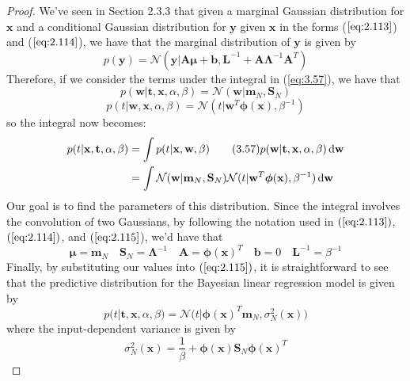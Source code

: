 \begin{proof}
    We've seen in Section 2.3.3 that given a marginal Gaussian distribution
    for $\mathbf{x}$ and a conditional Gaussian distribution for $\mathbf{y}$
    given $\mathbf{x}$ in the forms ($\ref{eq:2.113}$) and ($\ref{eq:2.114}$),
    we have that the marginal distribution of $\mathbf{y}$ is given by
    \begin{equation*}
        p(\mathbf{y}) 
        = \mathcal{N}(\mathbf{y} | \mathbf{A}\bm{\mu} + \mathbf{b}, \mathbf{L}^{-1}
            + \mathbf{A\Lambda}^{-1} \mathbf{A}^T) 
        \tag{2.115}\label{eq:2.115}
    \end{equation*}
    Therefore, if we consider the terms under the integral in (\ref{eq:3.57}),
    we have that
    \[
        p(\mathbf{w} | \mathbf{t}, \mathbf{x}, \alpha, \beta) 
        = \mathcal{N}(\mathbf{w} | \mathbf{m}_N, \mathbf{S}_N)
    \] 
    \[
        p(t | \mathbf{w}, \mathbf{x}, \alpha, \beta) 
        = \mathcal{N}(t | \mathbf{w}^T\bm{\phi}(\mathbf{x}), \beta^{-1}) 
    \] 
    so the integral now becomes:
    \begin{align*}
        p(t | \mathbf{x}, \mathbf{t}, \alpha, \beta)
        &= \int p(t | \mathbf{x}, \mathbf{w}, \beta) \label{eq:3.57} \tag{3.57}
            p(\mathbf{w} | \mathbf{t}, \mathbf{x}, \alpha, \beta) \mathop{}\!\mathrm{d} \mathbf{w} \\
        &= \int \mathcal{N}(\mathbf{w} | \mathbf{m}_N, \mathbf{S}_N)
        \mathcal{N}(t | \mathbf{w}^T\bm{\phi}(\mathbf{x}), \beta^{-1}) \mathop{}\!\mathrm{d} \mathbf{w}
    \end{align*}
    Our goal is to find the parameters of this distribution. Since 
    the integral involves the convolution of two Gaussians, by following
    the notation used in $(\ref{eq:2.113})$, $(\ref{eq:2.114})$, and $(\ref{eq:2.115}$),
    we'd have that
    \[
        \bm{\mu} = \mathbf{m}_N 
        \hspace{1em}
        \mathbf{S}_N = \mathbf{\Lambda}^{-1}
        \hspace{1em}
        \mathbf{A} = \bm{\phi}(\mathbf{x})^T
        \hspace{1em}
        \mathbf{b} = 0
        \hspace{1em}
        \mathbf{L}^{-1} = \beta^{-1}
    \] 
    Finally, by substituting our values into $(\ref{eq:2.115})$, it is 
    straightforward to see that the predictive distribution for the Bayesian 
    linear regression model is given by
    \begin{equation*}
        p(t | \mathbf{t}, \mathbf{x}, \alpha, \beta) 
        = \mathcal{N}\big(t | \bm{\phi}(\mathbf{x})^T\mathbf{m}_N, \sigma^2_N(\mathbf{x})\big)
        \tag{3.58}\label{eq:3.58}
    \end{equation*}
    where the input-dependent variance is given by
    \begin{equation*}
        \sigma_{N}^2(\mathbf{x})
        = \frac{1}{\beta} + \bm{\phi}(\mathbf{x})\mathbf{S}_N\bm{\phi}(\mathbf{x})^T
        \tag{3.59}\label{eq:3.59}
    \end{equation*}
\end{proof}


